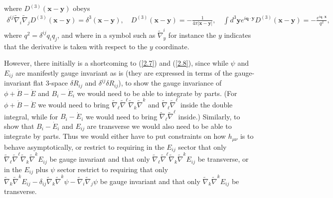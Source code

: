 \documentclass[aps,onecolumn,10pt]{revtex4}
\numberwithin{equation}{section}
\numberwithin{equation}{section}
\begin{document}
%
where $D^{(3)}(\mathbf{x}-\mathbf{y})$ obeys 
%
\begin{eqnarray}
\delta^{ij}\tilde{\nabla}_i\tilde{\nabla}_jD^{(3)}(\mathbf{x}-\mathbf{y})=\delta^3(\mathbf{x}-\mathbf{y}),\quad
D^{(3)}(\mathbf{x}-\mathbf{y})=-\frac{1}{4\pi |\mathbf{x}-\mathbf{y}|},\quad \int d^3\mathbf{y}e^{i\mathbf{q}\cdot\mathbf{y}}D^{(3)}(\mathbf{x}-\mathbf{y})=-\frac{e^{i\mathbf{q}\cdot\mathbf{x}}}{q^2},
\label{2.9}
\end{eqnarray}
%
where $q^2=\delta^{ij}q_{i}q_{j}$, and where in a symbol such as $\tilde{\nabla}_y^i$ for instance the $y$ indicates that the derivative is taken with respect to the $y$ coordinate.

However, there initially is a shortcoming to (\ref{2.7}) and (\ref{2.8}), since while $\psi$ and $E_{ij}$ are manifestly gauge invariant as is (they are expressed in terms of the gauge-invariant flat 3-space $\delta R_{ij}$ and $\delta^{ij}\delta R_{ij}$), to show the gauge invariance of $\phi+\dot{B}-\ddot{E}$ and $B_i -\dot{E}_i$ we would need to be able to integrate by parts. (For $\phi+\dot{B}-\ddot{E}$  we would need to bring $\tilde{\nabla}_{\ell}\tilde{\nabla}^{\ell} \tilde{\nabla}_k\tilde{\nabla}^k$ and $\tilde{\nabla}_{\ell}\tilde{\nabla}^{\ell}$ inside the double integral, while for $B_i-\dot{E}_i$ we would need to bring $\tilde{\nabla}_{\ell}\tilde{\nabla}^{\ell}$ inside.) Similarly, to show that $B_i -\dot{E}_i$ and $E_{ij}$ are transverse we would also need to be able to integrate by parts. Thus we would either have to put constraints on how $h_{\mu\nu}$ is to behave asymptotically, or restrict to requiring in the $E_{ij}$ sector that only $\tilde{\nabla}_{\ell}\tilde{\nabla}^{\ell}\tilde{\nabla}_k\tilde{\nabla}^kE_{ij}$ be gauge invariant and that only $\tilde{\nabla}_{\ell}\tilde{\nabla}^{\ell}\tilde{\nabla}_k\tilde{\nabla}^kE_{ij}$ be transverse, or in the $E_{ij}$ plus $\psi$ sector restrict to requiring that only $\tilde{\nabla}_k\tilde{\nabla}^kE_{ij}-\delta_{ij}\tilde{\nabla}_k\tilde{\nabla}^k\psi-\tilde{\nabla}_i\tilde{\nabla}_j\psi$ be gauge invariant and that only $\tilde{\nabla}_k\tilde{\nabla}^kE_{ij}$ be transverse. 
\end{document}
